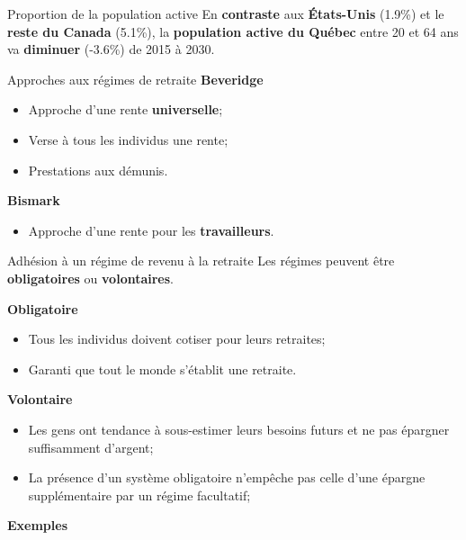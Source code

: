 \documentclass[10pt, french]{article}
\begin{document}
\begin{multicols*}{3}
\begin{conceptgen}{Proportion de la population active}
En \textbf{contraste} aux \textbf{États-Unis} (1.9\%) et le \textbf{reste du Canada} (5.1\%), la \textbf{population active du Québec} entre 20 et 64 ans va \textbf{diminuer} (-3.6\%) de 2015 à 2030. 
\end{conceptgen} 


\begin{conceptgen}{Approches aux régimes de retraite}
\textbf{Beveridge}
\begin{itemize}[leftmargin = *]
	\item	Approche d'une rente \textbf{universelle};
	\item	Verse à tous les individus une rente;
	\item	Prestations aux démunis.
\end{itemize}
\tcbline
\textbf{Bismark}
\begin{itemize}[leftmargin = *]
	\item	Approche d'une rente pour les \textbf{travailleurs}.
\end{itemize}
\end{conceptgen}

\begin{conceptgen}{Adhésion à un régime de revenu à la retraite}
Les régimes peuvent être \textbf{obligatoires} ou \textbf{volontaires}.

\textbf{Obligatoire}
\begin{itemize}[leftmargin = *]
	\item	Tous les individus doivent cotiser pour leurs retraites;
	\item	Garanti que tout le monde s'établit une retraite.
\end{itemize}

\textbf{Volontaire}
\begin{itemize}[leftmargin = *]
	\item	Les gens ont tendance à sous-estimer leurs besoins futurs et ne pas épargner suffisamment d'argent;
	\item	La présence d'un système obligatoire n'empêche pas celle d'une épargne supplémentaire par un régime facultatif;
\end{itemize}

\begin{center}
	\textbf{Exemples}
\end{center}


\end{conceptgen}
\end{multicols*}
\end{document}
